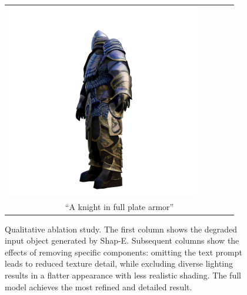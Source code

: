 \begin{figure}
{\begin{tabular}{ccccc}
        \includegraphics[width=0.24\linewidth, trim=50 0 50 0, clip]{images/ablation_plot/full/full_tile_5.png} \\
        \multicolumn{5}{c}{``A knight in full plate armor''}
    \end{tabular}
    }
    \caption{Qualitative ablation study. The first column shows the degraded input object generated by Shap-E. Subsequent columns show the effects of removing specific components: omitting the text prompt leads to reduced texture detail, while excluding diverse lighting results in a flatter appearance with less realistic shading. The full model achieves the most refined and detailed result.}
    \label{fig:ablation}
\end{figure}
